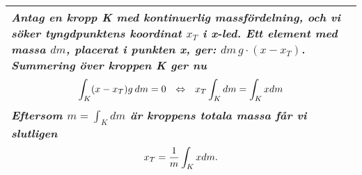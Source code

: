 \documentclass[a4paper]{article}
\begin{document}
\\\\\\
\begin{tabular}{|L{11.5cm}|} \hline
\textit{Antag en kropp K med \textbf{kontinuerlig massfördelning}, och vi söker tyngdpunktens koordinat $x_T$ i x-led. Ett element med massa $dm$, placerat i punkten x, ger: $dm\hspace{2pt} g\cdot(x-x_T)$. Summering över kroppen K ger nu}
\begin{equation*}
\begin{array}{>{\displaystyle}c}
\int_{K}(x-x_T)g \hspace{2pt} dm=0 \hspace{0.25cm} \Leftrightarrow  \hspace{0.25cm} x_T\int_{K}dm=\int_{K}xdm
\end{array}
\end{equation*}
\textit{Eftersom $m=\int_Kdm$ är kroppens totala massa får vi slutligen}
\begin{equation*}
\begin{array}{>{\displaystyle}c}
x_T=\frac{1}{m}\int_Kxdm.
\end{array}
\end{equation*}
\\\hline
\end{tabular}
\\\\\\
\end{document}
